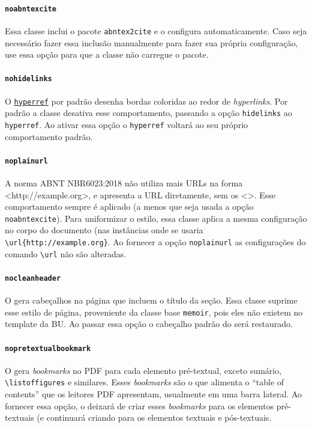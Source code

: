 \documentclass[embeddedlogo]{ufsc-thesis-rn46-2019}
\newcommand{\lacmd}[1]{\texttt{\textbackslash{}#1}}
\begin{document}
\paragraph*{\texttt{noabntexcite}} Essa classe inclui o pacote
\texttt{abntex2cite} e o configura automaticamente. Caso seja necessário fazer
essa inclusão manualmente para fazer sua própria configuração, use essa opção
para que a classe não carregue o pacote.

\paragraph*{\texttt{nohidelinks}} O
\href{https://ctan.org/pkg/hyperref}{\texttt{hyperref}} por padrão desenha
bordas coloridas ao redor de \emph{hyperlinks}. Por padrão a classe desativa
esse comportamento, passando a opção \texttt{hidelinks} ao \texttt{hyperref}.
Ao ativar essa opção o \texttt{hyperref} voltará ao seu próprio comportamento
padrão.

\paragraph*{\texttt{noplainurl}} A norma ABNT NBR6023:2018 não utiliza mais URLs
na forma <http://example.org>, e apresenta a URL diretamente, sem os <>.  Esse
comportamento sempre é aplicado (a menos que seja usada a opção
\texttt{noabntexcite}). Para uniformizar o estilo, essa classe aplica a mesma
configuração no corpo do documento (nas instâncias onde se usaria
\lacmd{url\{http://example.org\}}. Ao fornecer a opção \texttt{noplainurl} as
configurações do comando \lacmd{url} não são alteradas.


\paragraph*{\texttt{nocleanheader}} O \abnTeX{} gera cabeçalhos na página que
incluem o título da seção. Essa classe suprime esse estilo de página,
proveniente da classe base \texttt{memoir}, pois eles não existem no template
da BU. Ao passar essa opção o cabeçalho padrão do \abnTeX{} será restaurado.

\paragraph*{\texttt{nopretextualbookmark}} O \abnTeX{} gera \emph{bookmarks} no
PDF para cada elemento pré-textual, exceto sumário, \lacmd{listoffigures} e
similares. Esses \emph{bookmarks} são o que alimenta o ``table of contents'' que
os leitores PDF apresentam, usualmente em uma barra lateral.  Ao fornecer essa
opção, o \abnTeX{} deixará de criar esses \emph{bookmarks} para os elementos
pré-textuais (e continuará criando para os elementos textuais e pós-textuais.
\end{document}
